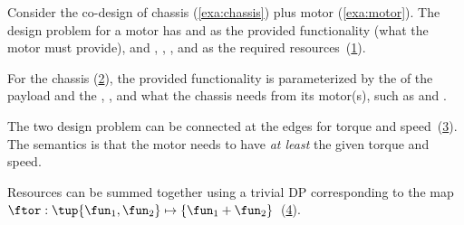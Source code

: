 \begin{example}
	\label{exa:chassis_plus_motor}
	Consider the co-design of chassis (\cref{exa:chassis}) plus motor (\cref{exa:motor}).
	The design problem for a motor has  and  as the provided functionality (what the motor must provide), and , , , and  as the required resources~(\cref{fig:motor}).

	\begin{figure}[h!]
		\centering
		\caption{}
		\label{fig:motor}
	\end{figure}

	For the chassis (\cref{fig:gmcdp_chassis}), the provided functionality is parameterized by the  of the payload and the , , and what the chassis needs from its motor(s), such as  and .

	\begin{figure}[h!]
		\centering
		\caption{}
		\label{fig:gmcdp_chassis}
	\end{figure}

	The two design problem can be connected at the edges for torque and speed~(\cref{fig:gmcdp_chassis_plus_motor_series}).
	The semantics is that the motor needs to have \emph{at least} the given torque and speed.


	\begin{figure}[h!]
		\centering
		\caption{}
		\label{fig:gmcdp_chassis_plus_motor_series}
	\end{figure}

	Resources can be summed together using a trivial DP corresponding to the map $\ftor:\tup{\fun_{1},\fun_{2}} \mapsto\{\fun_{1}+\fun_{2}\}$~(\cref{fig:total_cost}).

	\begin{figure}[h!]
		\centering
		\caption{}
		\label{fig:total_cost}
	\end{figure}



\end{example}
